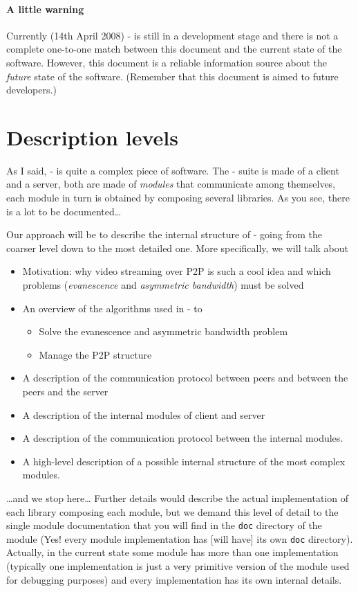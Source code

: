 \documentclass{medusabook}
\begin{document}
\paragraph{A little warning}
Currently (14th April 2008) \medusa- is still in a development stage
and there is not a complete one-to-one match between this document and
the current state of the software.  However, this document is a
reliable information source about the \emph{future} state of the
software.  (Remember that this document is aimed to future developers.)

\section{Description levels}
\label{sect:0.0;medusa_book}

As I said, \medusa- is quite a complex piece of software.  The
\medusa- suite is made of a client and a server, both are made of
\emph{modules} that communicate among themselves, each module in turn
is obtained by composing several libraries.  As you see, there is a
lot to be documented\ldots

Our approach will be to describe the internal structure of \medusa-
going from the coarser level down to the most detailed one.  More
specifically, we will talk about

\begin{itemize}
\item
Motivation: why video streaming over P2P is such a cool idea and which
problems (\emph{evanescence} and \emph{asymmetric bandwidth}) must be
solved
\item
An overview of the algorithms used in \medusa- to 
\begin{itemize}
  \item
    Solve the evanescence and asymmetric bandwidth problem
  \item
    Manage the P2P structure
\end{itemize}
\item
A description of the communication protocol between peers and between
the peers and the server
\item
A description of the internal modules of client and server
\item
A description of the communication protocol between the internal
modules. 
\item
A high-level description of a possible internal structure of the most
complex modules.
\end{itemize}
%
\ldots and we stop here\ldots{} Further details would describe the
actual implementation of each library composing each module, but we
demand this level of detail to the single module documentation that
you will find in the \texttt{doc} directory of the module (Yes! every
module implementation has [will have] its own \texttt{doc} directory).
Actually, in the current state some module has more than one
implementation (typically one implementation is just a very primitive
version of the module used for debugging purposes) and every
implementation has its own internal details.
\end{document}
